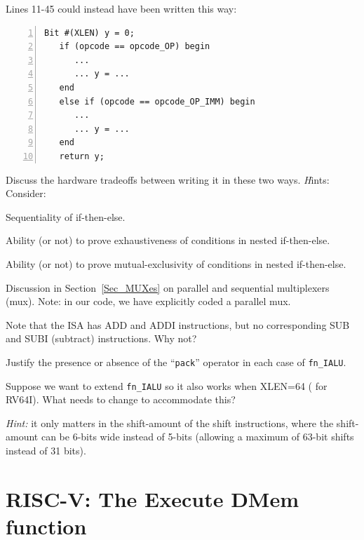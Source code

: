 \hdivider

\Exercise

Lines 11-45 could instead have been written this way:

{\small
\begin{Verbatim}[frame=single, numbers=left]
   Bit #(XLEN) y = 0;
   if (opcode == opcode_OP) begin
      ...
      ... y = ...
   end
   else if (opcode == opcode_OP_IMM) begin
      ...
      ... y = ...
   end
   return y;
\end{Verbatim}
}

Discuss the hardware tradeoffs between writing it in these two ways.
{\emph Hints:} Consider:

\begin{tightlist}

  \item Sequentiality of if-then-else.
  \item Ability (or not) to prove exhaustiveness of conditions in nested if-then-else.
  \item Ability (or not) to prove mutual-exclusivity of conditions in nested if-then-else.
  \item Discussion in Section~\ref{Sec_MUXes} on parallel and
    sequential multiplexers (mux).  Note: in our code, we have
    explicitly coded a parallel mux.

\end{tightlist}

\Exercise

Note that the ISA has ADD and ADDI instructions, but no corresponding
SUB and SUBI (subtract) instructions.  Why not?

\Exercise

Justify the presence or absence of the ``{\tt pack}'' operator in each
case of {\tt fn\_IALU}.

\Exercise

Suppose we want to extend {\tt fn\_IALU} so it also works when XLEN=64
({\ie} for RV64I).  What needs to change to accommodate this?

\emph{Hint:} it only matters in the shift-amount of the shift
instructions, where the shift-amount can be 6-bits wide instead of
5-bits (allowing a maximum of 63-bit shifts instead of 31 bits).

\Endexercise


\section{RISC-V: The Execute DMem function}


